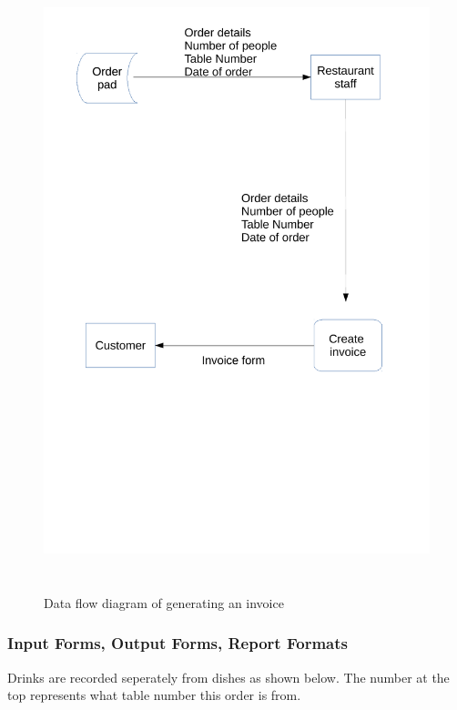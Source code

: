 \begin{figure}[H]
    \includegraphics[height = 18cm]{./Analysis/InvoiceGeneration}
    \caption{Data flow diagram of generating an invoice} \label{fig:Data_flow_diagram}
\end{figure}

\subsubsection{Input Forms, Output Forms, Report Formats}
Drinks are recorded seperately from dishes as shown below. The number at the top represents what table number this order is from.


